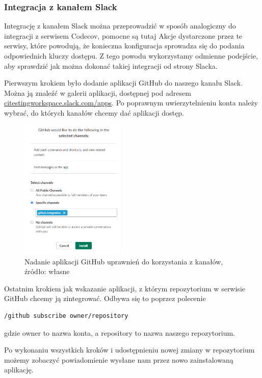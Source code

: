 \subsubsection{Integracja z kanałem Slack}
Integrację z kanałem Slack można przeprowadzić w sposób analogiczny do integracji z serwisem Codecov, pomocne są tutaj Akcje dystarczone przez te serwisy, które powodują, że konieczna konfiguracja sprowadza się do podania odpowiednich kluczy dostępu. Z tego powodu wykorzystamy odmienne podejście, aby sprawdzić jak można dokonać takiej integracji od strony Slacka. 

Pierwszym krokiem było dodanie aplikacji GitHub do naszego kanału Slack. Można ją znaleźć w galerii aplikacji, dostępnej pod adresem \url{citestingworkspace.slack.com/apps}. Po poprawnym uwierzytelnieniu konta należy wybrać, do których kanałów chcemy dać aplikacji dostęp. 

\begin{figure}[htbp]
    \centering
    \includegraphics[width=5cm]{images/testingCI7.png}
    \caption{Nadanie aplikacji GitHub uprawnień do korzystania z kanałów, źródło: własne}
    \label{fig:ci7}
\end{figure}
Ostatnim krokiem jak wskazanie aplikacji, z którym repozytorium w serwisie GitHub chcemy ją zintegrować. Odbywa się to poprzez polecenie 
\begin{lstlisting}[caption={Polecenie pozwalające połączyć aplikację GitHub z repozytorium}]
/github subscribe owner/repository
\end{lstlisting}

gdzie owner to nazwa konta, a repository to nazwa naszego repozytorium. 

Po wykonaniu wszystkich kroków i udostępnieniu nowej zmiany w repozytorium możemy zobaczyć powiadomienie wysłane nam przez nowo zainstalowaną aplikację. 

